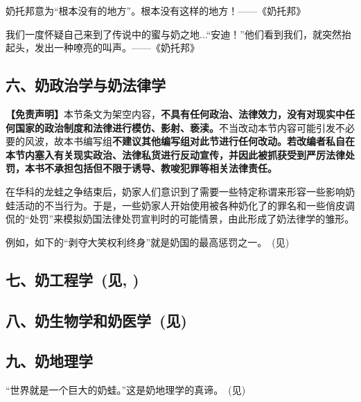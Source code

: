 奶托邦意为“根本没有的地方”。根本没有这样的地方！——《奶托邦》

我们一度怀疑自己来到了传说中的蜜与奶之地...“安迪！”他们看到我们，就突然抬起头，发出一种嘹亮的叫声。——《奶托邦》



\subsection{六、奶政治学与奶法律学}

\textbf{【免责声明】}本节条文为架空内容，\textbf{不具有任何政治、法律效力，没有对现实中任何国家的政治制度和法律进行模仿、影射、亵渎。}不当改动本节内容可能引发不必要的风波，故本书编写组\textbf{不建议其他编写组对此节进行任何改动。若改编者私自在本节内塞入有关现实政治、法律私货进行反动宣传，并因此被抓获受到严厉法律处罚，本书不承担包括但不限于诱导、教唆犯罪等相关法律责任。}

在华科的龙蛙之争结束后，奶家人们意识到了需要一些特定称谓来形容一些影响奶蛙活动的不当行为。于是，一些奶家人开始使用被各种奶化了的罪名和一些俏皮调侃的“处罚”来模拟奶国法律处罚宣判时的可能情景，由此形成了奶法律学的雏形。

例如，如下的“剥夺大笑权利终身”就是奶国的最高惩罚之一。~(见)

\clearpage


\subsection[七、奶工程学]{七、奶工程学~(见, )}





\clearpage
\subsection[八、奶生物学和奶医学]{八、奶生物学和奶医学~(见)}



\subsection{九、奶地理学}

“世界就是一个巨大的奶蛙。”这是奶地理学的真谛。~(见)

